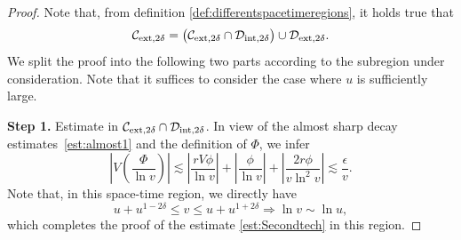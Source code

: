 \documentclass[a4paper,reqno]{amsart}
\theoremstyle{definition}
\numberwithin{equation}{section}
\begin{document}
\begin{proof}
Note that, from definition \eqref{def:differentspacetimeregions}, it holds true that
\begin{equation*}
\mathcal{C}_{{\rm{ext}},2\delta}=\big(\mathcal{C}_{\rm{ext},2\delta}
\cap \mathcal{D}_{\rm{int},2\delta}\big)\cup \mathcal{D}_{\rm{ext},2\delta}.
\end{equation*}
We split the proof into the following two parts according to the subregion under consideration. Note that it suffices to consider the case where $u$ is sufficiently large.

\smallskip
\textbf{Step 1.} Estimate in $\mathcal{C}_{\rm{ext},2\delta}
\cap \mathcal{D}_{\rm{int},2\delta}$. 
In view of the almost sharp decay estimates~\eqref{est:almost1} and the definition of $\Phi$, we infer
\begin{equation*}
    \left|V\left(\frac{\Phi}{\ln v}\right)\right|\lesssim 
    \left|\frac{rV\phi}{\ln v}\right|
+\left|\frac{\phi}{\ln v}\right|
    +\left|\frac{2r\phi}{v\ln^{2}v}\right|\lesssim \frac{\epsilon}{v}.
\end{equation*}
Note that, in this space-time region, we directly have 
\begin{equation*}
  u+  u^{1-2\delta}\le v\le u+u^{1+2\delta}\Longrightarrow 
    \ln v\sim \ln u,
\end{equation*}
which completes the proof of the estimate \eqref{est:Secondtech} in this region.


\end{proof}
\end{document}
